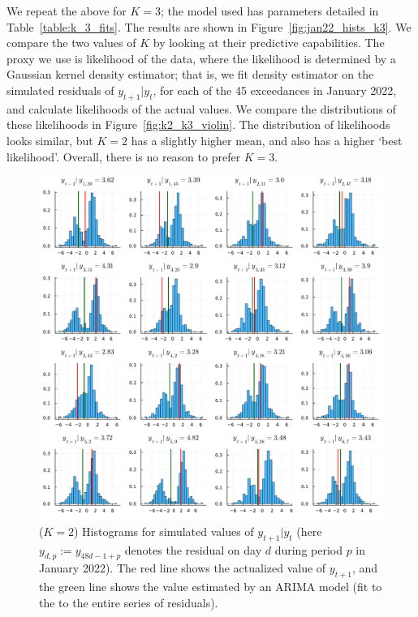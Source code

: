 \documentclass[11pt,twoside,openany]{book}
\numberwithin{Theorem}{chapter}
\numberwithin{Definition}{chapter}
\numberwithin{Lemma}{chapter}
\numberwithin{Algorithm}{chapter}
\numberwithin{equation}{chapter}
\begin{document}
We repeat the above for $K=3$; the model used has parameters detailed in
Table~\ref{table:k_3_fits}. The results are shown in
Figure~\ref{fig:jan22_hists_k3}. We compare the two values of $K$ by looking at
their predictive capabilities.
The proxy we use is likelihood of the data, where the likelihood
is determined by a Gaussian kernel density estimator; that is, we fit density
estimator on the simulated residuals of $y_{t+1}|y_{t}$, for each of
the 45 exceedances in January 2022, and calculate likelihoods of the actual
values. We compare the distributions of these likelihoods in Figure~\ref{fig:k2_k3_violin}. The distribution of likelihoods
looks similar, but $K=2$ has a
slightly higher mean, and also has a higher `best likelihood'.
Overall, there is no reason to prefer $K=3$.


\begin{figure}[htp]
  \centering
  \includegraphics[scale=0.5]{../elexon/figures/ytp1_giv_yt_jan_22_k2_full_pred_final.pdf}
  \caption{($K=2$) Histograms for simulated values of $y_{t+1}|y_{t}$ (here $y_{d,p}:=y_{48d - 1 + p}$ denotes the residual on day $d$ during period $p$ in January
    2022).
The red line shows the actualized value of $y_{t+1}$, and the green line shows the
value estimated by an ARIMA model (fit to the to the entire series of residuals).}\label{fig:jan22_hists_22}
\end{figure}
\end{document}
